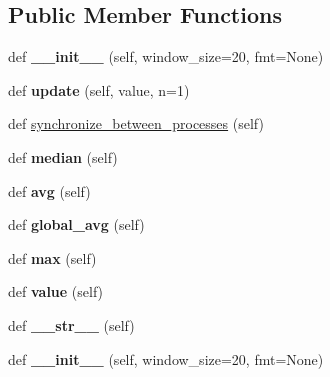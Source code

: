 \subsection*{Public Member Functions}
\begin{DoxyCompactItemize}
\item 
\mbox{\label{classutils_1_1SmoothedValue_ae3f395e1967e26ff15efbdd5149dc1ee}} 
def {\bfseries \+\_\+\+\_\+init\+\_\+\+\_\+} (self, window\+\_\+size=20, fmt=None)
\item 
\mbox{\label{classutils_1_1SmoothedValue_ad907a5758d104cef55dbc7056f29d6e4}} 
def {\bfseries update} (self, value, n=1)
\item 
def \hyperlink{classutils_1_1SmoothedValue_a8d10c867abf46adb6b0be5b6adcf1236}{synchronize\+\_\+between\+\_\+processes} (self)
\item 
\mbox{\label{classutils_1_1SmoothedValue_ab3e14bcdb1429898324595abbf30ec07}} 
def {\bfseries median} (self)
\item 
\mbox{\label{classutils_1_1SmoothedValue_a17cc6f86030d87fe010925409bc1ed2a}} 
def {\bfseries avg} (self)
\item 
\mbox{\label{classutils_1_1SmoothedValue_a36a8e70157cd8708141835f19b5d972d}} 
def {\bfseries global\+\_\+avg} (self)
\item 
\mbox{\label{classutils_1_1SmoothedValue_a158b58316c2fce950e45973acd514523}} 
def {\bfseries max} (self)
\item 
\mbox{\label{classutils_1_1SmoothedValue_a102baf7191d54900fc448004a41f4da5}} 
def {\bfseries value} (self)
\item 
\mbox{\label{classutils_1_1SmoothedValue_ad4cc419248d1d78c567600ecf8236e6a}} 
def {\bfseries \+\_\+\+\_\+str\+\_\+\+\_\+} (self)
\item 
\mbox{\label{classutils_1_1SmoothedValue_ae3f395e1967e26ff15efbdd5149dc1ee}} 
def {\bfseries \+\_\+\+\_\+init\+\_\+\+\_\+} (self, window\+\_\+size=20, fmt=None)

\end{DoxyCompactItemize}
